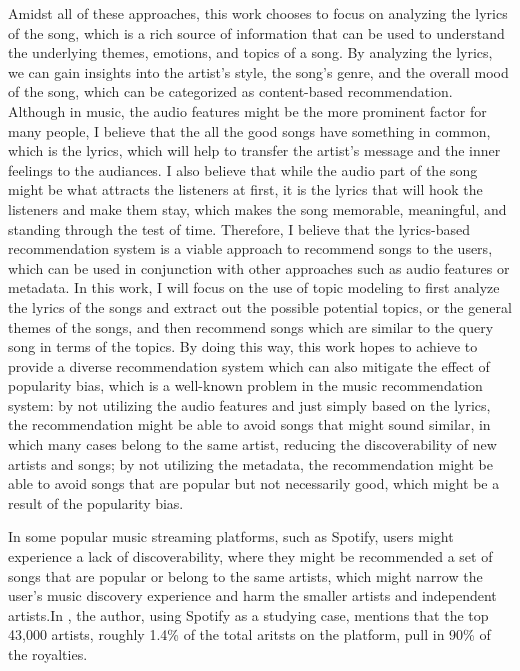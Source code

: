 \documentclass[12pt]{article}
\begin{document}
Amidst all of these approaches, this work chooses to focus on analyzing the
lyrics of the song, which is a rich source of information that can be used to
understand the underlying themes, emotions, and topics of a song. By analyzing
the lyrics, we can gain insights into the artist's style, the song's genre, and
the overall mood of the song, which can be categorized as content-based
recommendation. Although in music, the audio features might be the more
prominent factor for many people, I believe that the all the good songs have
something in common, which is the lyrics, which will help to transfer the
artist's message and the inner feelings to the audiances. I also believe that
while the audio part of the song might be what attracts the listeners at first,
it is the lyrics that will hook the listeners and make them stay, which makes
the song memorable, meaningful, and standing through the test of time.
Therefore, I believe that the lyrics-based recommendation system is a viable
approach to recommend songs to the users, which can be used in conjunction with
other approaches such as audio features or metadata. In this work, I will focus
on the use of topic modeling to first analyze the lyrics of the songs and
extract out the possible potential topics, or the general themes of the songs,
and then recommend songs which are similar to the query song in terms of the
topics. By doing this way, this work hopes to achieve to provide a diverse
recommendation system which can also mitigate the effect of popularity bias,
which is a well-known problem in the music recommendation system: by not
utilizing the audio features and just simply based on the lyrics, the
recommendation might be able to avoid songs that might sound similar, in which
many cases belong to the same artist, reducing the discoverability of new
artists and songs; by not utilizing the metadata, the recommendation might be
able to avoid songs that are popular but not necessarily good, which might be a
result of the popularity bias.

In some popular music streaming platforms, such as Spotify, users might
experience a lack of discoverability, where they might be recommended a set of
songs that are popular or belong to the same artists, which might narrow the
user's music discovery experience and harm the smaller artists and independent
artists.In \cite{dugeri2024legal}, the author, using Spotify as a studying
case, mentions that the top 43,000 artists, roughly 1.4\% of the total aritsts
on the platform, pull in 90\% of the royalties.
\end{document}
